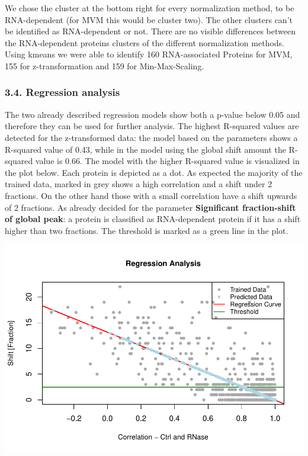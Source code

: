\documentclass[
  12pt,
]{article}
\begin{document}
We chose the cluster at the bottom right for every normalization method,
to be RNA-dependent (for MVM this would be cluster two). The other
clusters can't be identified as RNA-dependent or not. There are no
visible differences between the RNA-dependent proteins clusters of the
different normalization methods. Using kmeans we were able to identify
160 RNA-associated Proteins for MVM, 155 for z-transformation and 159
for Min-Max-Scaling.

\hypertarget{regression-analysis-1}{%
\subsubsection{3.4. Regression analysis}\label{regression-analysis-1}}

The two already described regression models show both a p-value below
0.05 and therefore they can be used for further analysis. The highest
R-squared values are detected for the z-transformed data: the model
based on the parameters shows a R-squared value of 0.43, while in the
model using the global shift amount the R-squared value is 0.66. The
model with the higher R-squared value is visualized in the plot below.
Each protein is depicted as a dot. As expected the majority of the
trained data, marked in grey shows a high correlation and a shift under
2 fractions. On the other hand those with a small correlation have a
shift upwards of 2 fractions. As already decided for the parameter
\textbf{Significant fraction-shift of global peak}: a protein is
classified as RNA-dependent protein if it has a shift higher than two
fractions. The threshold is marked as a green line in the plot.

\includegraphics{final_files/figure-latex/unnamed-chunk-5-1.pdf}
\end{document}
